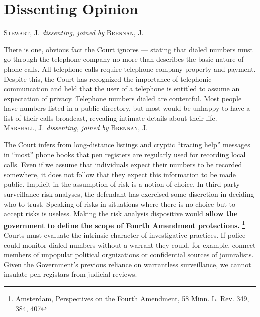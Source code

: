\documentclass[paper=letter,fontsize=10pt]{article}
\newcommand{\pet}[1]{{\color{navy}{#1}}}
\newcommand{\note}[1]{{\marginpar{\footnotesize \texttt{#1}}}}
\begin{document}
\section{Dissenting Opinion}
	\noindent \textsc{Stewart, J.} \textit{dissenting, joined by} \textsc{Brennan, J.}\par
	There is one, obvious fact the Court ignores --- stating that dialed numbers must go through the telephone company no more than describes the basic nature of phone calls.
	All telephone calls require telephone company property and payment.
	Despite this, the Court has recognized the importance of telephonic communcation and held that the user of a telephone is entitled to assume an expectation of privacy.
	Telephone numbers dialed are contentful.
	Most people have numbers listed in a public directory, but most would be unhappy to have a list of their calls broadcast, revealing intimate details about their life. \\
	\noindent \textsc{Marshall, J.} \textit{dissenting, joined by} \textsc{Brennan, J.}\par
		The Court infers from long-distance listings and cryptic “tracing help” messages in “most” phone books that pen registers are regularly used for recording local calls.
		Even if we assume that individuals expect their numbers to be recorded somewhere, it does not follow that they expect this information to be made public.
		Implicit in the assumption of risk is a notion of choice. In third-party surveillance risk analyses, the defendant has exercised some discretion in deciding who to trust.
		\pet{By contrast in this case, unless someone is prepared to forgo a necessity, they cannot help but accept the risk of surveillance.}\note{Sounds a lot like the case for modern phones.}
		Speaking of risks in situations where there is no choice but to accept risks is useless.
		Making the risk analysis dispositive would \textbf{allow the government to define the scope of Fourth Amendment protections.} 
		\pet{Law enforcement officials, simply by announcing their intent to monitor random samples of first-class mail or phone conversations, could require that the public simply take on a risk in such communications from now on.}\footnote{Amsterdam, Perspectives on the Fourth Amendment, 58 Minn. L. Rev. 349, 384, 407}
		Courts must evaluate the intrinsic character of investigative practices.
		If police could monitor dialed numbers without a warrant they could, for example, connect members of unpopular political orgnizations or confidential sources of jounralists.
		Given the Government’s previous reliance on warrantless surveillance, we cannot insulate pen registars from judicial reviews.
\end{document}
